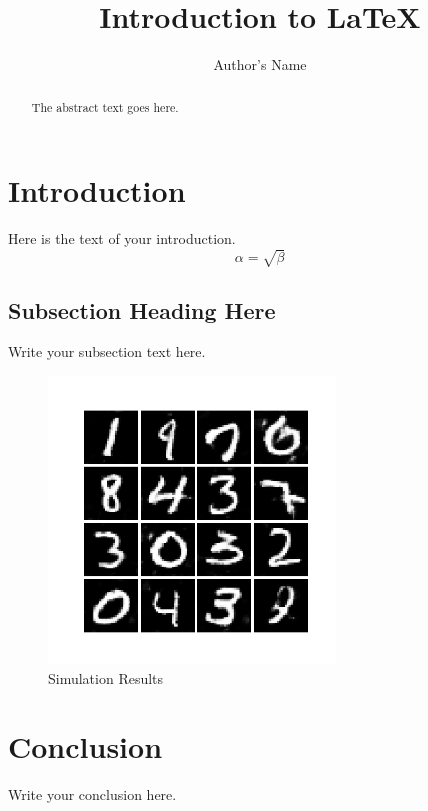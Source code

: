 \documentclass{article}
\begin{document}
\title{Introduction to \LaTeX{}}
\author{Author's Name}

\maketitle

\begin{abstract}
The abstract text goes here.
\end{abstract}

\section{Introduction}
Here is the text of your introduction.
\cite{conv_guide}
\begin{equation}
    \label{simple_equation}
    \alpha = \sqrt{ \beta }
\end{equation}

\subsection{Subsection Heading Here}
Write your subsection text here.

\begin{figure}
    \centering
    \includegraphics[width=3.0in]{myfigure}
    \caption{Simulation Results}
    \label{simulationfigure}
\end{figure}

\section{Conclusion}
Write your conclusion here.
\end{document}
